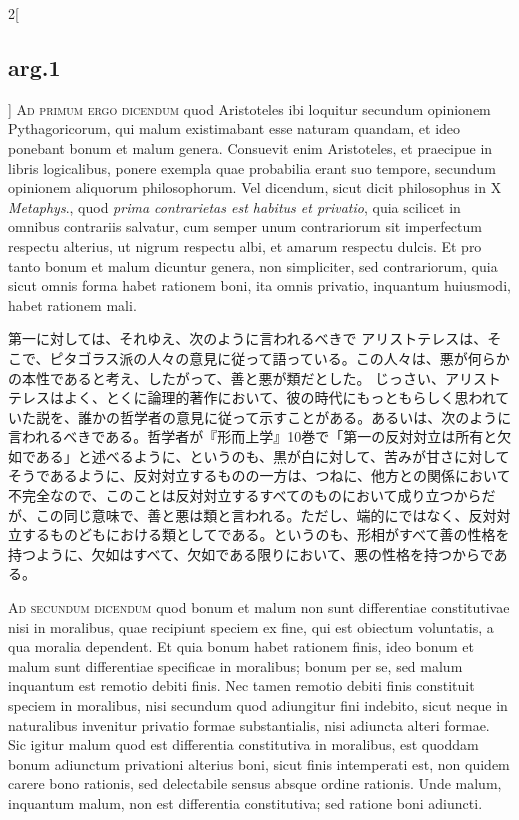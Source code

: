 \documentclass[paper=a4paper,fontsize=10pt,jafontsize=9pt,titlepage]{jlreq}
\begin{document}
\begin{paracol}{2}[\subsection{arg.1}]
{\scshape Ad primum ergo dicendum} quod Aristoteles ibi loquitur
secundum opinionem Pythagoricorum, qui malum existimabant esse naturam
quandam, et ideo ponebant bonum et malum genera. Consuevit enim
Aristoteles, et praecipue in libris logicalibus, ponere exempla quae
probabilia erant suo tempore, secundum opinionem aliquorum
philosophorum. Vel dicendum, sicut dicit philosophus in X {\itshape Metaphys}.,
quod {\itshape prima contrarietas est habitus et privatio}, quia scilicet in
omnibus contrariis salvatur, cum semper unum contrariorum sit
imperfectum respectu alterius, ut nigrum respectu albi, et amarum
respectu dulcis. Et pro tanto bonum et malum dicuntur genera, non
simpliciter, sed contrariorum, quia sicut omnis forma habet rationem
boni, ita omnis privatio, inquantum huiusmodi, habet rationem mali.

\switchcolumn

第一に対しては、それゆえ、次のように言われるべきで
アリストテレスは、そこで、ピタゴラス派の人々の意見に従って語っている。この人々は、悪が何らかの本性であると考え、したがって、善と悪が類だとした。
じっさい、アリストテレスはよく、とくに論理的著作において、彼の時代にもっともらしく思われていた説を、誰かの哲学者の意見に従って示すことがある。あるいは、次のように言われるべきである。哲学者が『形而上学』10巻で「第一の反対対立は所有と欠如である」と述べるように、というのも、黒が白に対して、苦みが甘さに対してそうであるように、反対対立するものの一方は、つねに、他方との関係において不完全なので、このことは反対対立するすべてのものにおいて成り立つからだが、この同じ意味で、善と悪は類と言われる。ただし、端的にではなく、反対対立するものどもにおける類としてである。というのも、形相がすべて善の性格を持つように、欠如はすべて、欠如である限りにおいて、悪の性格を持つからである。

\switchcolumn*[\subsection{ad.2}]

{\scshape Ad secundum dicendum} quod bonum et malum non sunt
differentiae constitutivae nisi in moralibus, quae recipiunt speciem ex
fine, qui est obiectum voluntatis, a qua moralia dependent. Et quia
bonum habet rationem finis, ideo bonum et malum sunt differentiae
specificae in moralibus; bonum per se, sed malum inquantum est remotio
debiti finis. Nec tamen remotio debiti finis constituit speciem in
moralibus, nisi secundum quod adiungitur fini indebito, sicut neque in
naturalibus invenitur privatio formae substantialis, nisi adiuncta
alteri formae. Sic igitur malum quod est differentia constitutiva in
moralibus, est quoddam bonum adiunctum privationi alterius boni, sicut
finis intemperati est, non quidem carere bono rationis, sed delectabile
sensus absque ordine rationis. Unde malum, inquantum malum, non est
differentia constitutiva; sed ratione boni adiuncti.


\end{paracol}
\end{document}
